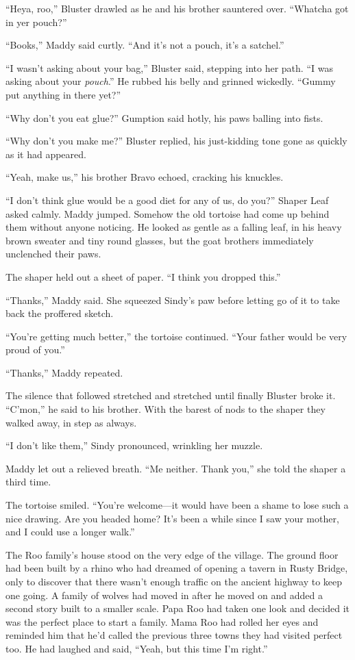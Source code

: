 \documentclass[10pt]{article}
\begin{document}
``Heya, roo,'' Bluster drawled as he and his brother sauntered over.
``Whatcha got in yer pouch?''

``Books,'' Maddy said curtly. ``And it's not a pouch, it's a satchel.''

``I wasn't asking about your bag,'' Bluster said, stepping into her
path. ``I was asking about your \emph{pouch}.'' He rubbed his belly and
grinned wickedly. ``Gummy put anything in there yet?''

``Why don't you eat glue?'' Gumption said hotly, his paws balling into
fists.

``Why don't you make me?'' Bluster replied, his just-kidding tone gone
as quickly as it had appeared.

``Yeah, make us,'' his brother Bravo echoed, cracking his knuckles.

``I don't think glue would be a good diet for any of us, do you?''
Shaper Leaf asked calmly. Maddy jumped. Somehow the old tortoise had
come up behind them without anyone noticing. He looked as gentle as a
falling leaf, in his heavy brown sweater and tiny round glasses, but the
goat brothers immediately unclenched their paws.

The shaper held out a sheet of paper. ``I think you dropped this.''

``Thanks,'' Maddy said. She squeezed Sindy's paw before letting go of it
to take back the proffered sketch.

``You're getting much better,'' the tortoise continued. ``Your father
would be very proud of you.''

``Thanks,'' Maddy repeated.

The silence that followed stretched and stretched until finally Bluster
broke it. ``C'mon,'' he said to his brother. With the barest of nods to
the shaper they walked away, in step as always.

``I don't like them,'' Sindy pronounced, wrinkling her muzzle.

Maddy let out a relieved breath. ``Me neither. Thank you,'' she told the
shaper a third time.

The tortoise smiled. ``You're welcome---it would have been a shame to
lose such a nice drawing. Are you headed home? It's been a while since I
saw your mother, and I could use a longer walk.''

The Roo family's house stood on the very edge of the village. The ground
floor had been built by a rhino who had dreamed of opening a tavern in
Rusty Bridge, only to discover that there wasn't enough traffic on the
ancient highway to keep one going. A family of wolves had moved in after
he moved on and added a second story built to a smaller scale. Papa Roo
had taken one look and decided it was the perfect place to start a
family. Mama Roo had rolled her eyes and reminded him that he'd called
the previous three towns they had visited perfect too. He had laughed
and said, ``Yeah, but this time I'm right.''
\end{document}
